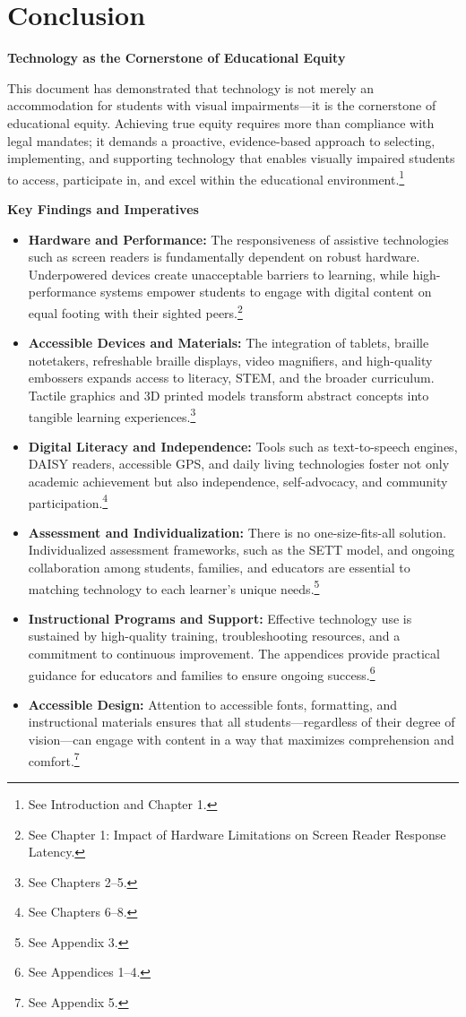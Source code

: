 \chapter{Conclusion}\label{main-conclusion}

\textbf{Technology as the Cornerstone of Educational Equity}

This document has demonstrated that technology is not merely an accommodation for students with visual impairments—it is the cornerstone of educational equity. Achieving true equity requires more than compliance with legal mandates; it demands a proactive, evidence-based approach to selecting, implementing, and supporting technology that enables visually impaired students to access, participate in, and excel within the educational environment.\footnote{See Introduction and Chapter 1.}

\textbf{Key Findings and Imperatives}

\begin{itemize}
    \item \textbf{Hardware and Performance:} The responsiveness of assistive technologies such as screen readers is fundamentally dependent on robust hardware. Underpowered devices create unacceptable barriers to learning, while high-performance systems empower students to engage with digital content on equal footing with their sighted peers.\footnote{See Chapter 1: Impact of Hardware Limitations on Screen Reader Response Latency.}
    \item \textbf{Accessible Devices and Materials:} The integration of tablets, braille notetakers, refreshable braille displays, video magnifiers, and high-quality embossers expands access to literacy, STEM, and the broader curriculum. Tactile graphics and 3D printed models transform abstract concepts into tangible learning experiences.\footnote{See Chapters 2–5.}
    \item \textbf{Digital Literacy and Independence:} Tools such as text-to-speech engines, DAISY readers, accessible GPS, and daily living technologies foster not only academic achievement but also independence, self-advocacy, and community participation.\footnote{See Chapters 6–8.}
    \item \textbf{Assessment and Individualization:} There is no one-size-fits-all solution. Individualized assessment frameworks, such as the SETT model, and ongoing collaboration among students, families, and educators are essential to matching technology to each learner’s unique needs.\footnote{See Appendix 3.}
    \item \textbf{Instructional Programs and Support:} Effective technology use is sustained by high-quality training, troubleshooting resources, and a commitment to continuous improvement. The appendices provide practical guidance for educators and families to ensure ongoing success.\footnote{See Appendices 1–4.}
    \item \textbf{Accessible Design:} Attention to accessible fonts, formatting, and instructional materials ensures that all students—regardless of their degree of vision—can engage with content in a way that maximizes comprehension and comfort.\footnote{See Appendix 5.}
\end{itemize}

